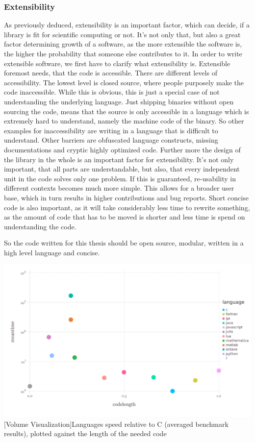 \subsubsection{Extensibility}
As previously deduced, extensibility is an important factor, which can decide, if a library is fit for scientific computing or not. 
It's not only that, but also a great factor determining growth of a software, as the more extensible the software is, the higher the probability that someone else contributes to it.
In order to write extensible software, we first have to clarify what extensibility is.
Extensible foremost needs, that the code is accessible. There are different levels of accessibility. The lowest level is closed source, where people purposely make the code inaccessible. While this is obvious, this is just a special case of not understanding the underlying language. Just shipping binaries without open sourcing the code, means that the source is only accessible in a language which is extremely hard to understand, namely the machine code of the binary. So other examples for inaccessibility are writing in a language that is difficult to understand. Other barriers are obfuscated language constructs, missing documentations and cryptic highly optimized code.
Further more the design of the library in the whole is an important factor for extensibility. It's not only important, that all parts are understandable, but also, that every independent unit in the code solves only one problem. 
If this is guaranteed, re-usability in different contexts becomes much more simple. This allows for a broader user base, which in turn results in higher contributions and bug reports. 
Short concise code is also important, as it will take considerably less time to rewrite something, as the amount of code that has to be moved is shorter and less time is spend on understanding the code.

So the code written for this thesis should be open source, modular, written in a high level language and concise.


\vspace{1em}
\begin{minipage}{\linewidth}
    \centering
    \includegraphics[width=0.9\linewidth]{graphics/julia_bench.pdf}
    [Volume Visualization]{Languages speed relative to C (averaged benchmark results), plotted against the length of the needed code}
    \label{fig:juliabench}
\end{minipage}

